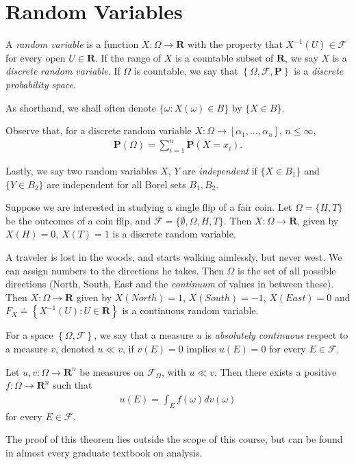 \section{Random Variables} 
\begin{definition}
	A \emph{random variable} is a function $X: \Omega \to \mathbf{R}$ with the property
	that $X^{-1}(U) \in \mathcal{F}$ for every open $U \in \mathbf{R}$. If the range of $X$
	is a countable subset of $\mathbf{R}$, we say $X$
	is a \emph{discrete random variable}. If $\Omega$ is countable, we say that 
	$\left\{ \Omega, \mathcal{F}, \mathbf{P} \right\}$ is a \emph{discrete probability 
	space}.
\end{definition}
As shorthand, we shall often denote $\{\omega: X(\omega) \in B\}$ by
$\{X \in B$\}.
\begin{remark}
	Observe that, for a discrete random variable $X: \Omega \to [\alpha_1,
	\ldots, \alpha_n]$,  $n \le \infty$, 
	\begin{align*}
		\mathbf{P}(\Omega) = \sum_{i =1}^n \mathbf{P}(X = x_i).
	\end{align*}
\end{remark}
Lastly, we say two random variables $X$, $Y$ are \emph{independent} if
$\{X \in B_1\}$ and $\{Y \in B_2\}$ are independent for all Borel sets
$B_1, B_2$. 
\begin{example}
	Suppose we are interested in studying a single flip of a fair coin.
	Let
	$\Omega = \{H, T\}$ be the outcomes of a coin flip, and
	$\mathcal{F} = \{\emptyset, \Omega, H, T \}$. Then $X: \Omega \to \mathbf{R}$, given by
	$X(H) = 0$, $X(T) = 1$ is a discrete random variable.
\end{example}
\begin{example}
	A traveler is lost in the woods, and starts walking aimlessly, but never
	west. 
	We can assign numbers to the directions he takes. 
	Then $\Omega$ is the set of all possible directions (North, South, East
	and the \emph{continuum} of values in between these). Then
	$X: \Omega \to \mathbf{R}$ given by $X(North) = 1$, $X(South) = -1$, $X(East) = 0$
	and $F_{X} \doteq \left\{ X^{-1}(U): U \in \mathbf{R} \right\}$ is a continuous 
	random
	variable.
\end{example}
\begin{definition}
	For a space $\left\{ \Omega, \mathcal{F} \right\}$, we say that a measure $u$ is
	\emph{absolutely continuous} respect to a measure $v$, denoted $u \ll v$, if
	$v(E) = 0$ implies $u(E) = 0$ for every $E \in \mathcal{F}$.
\end{definition}
\begin{theorem}
	Let $u,v: \Omega \to \mathbf{R}^n$ be measures on $\mathcal{F}_{\Omega}$, with $u \ll 
	v$.
	Then there exists a positive $f: \Omega \to \mathbf{R}^n$ such that
	\begin{align*}
		u(E) = \int_{E} f(\omega) dv(\omega)
	\end{align*}
	for every $E \in \mathcal{F}$.
\end{theorem}
The proof of this theorem lies outside the scope of this course, but can be
found in almost every graduate textbook on analysis. 

